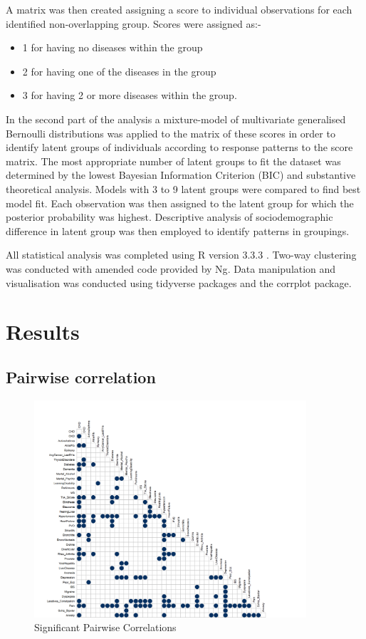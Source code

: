 \documentclass[12pt,]{report}
\providecommand{\tightlist}{%
  \setlength{\itemsep}{0pt}\setlength{\parskip}{0pt}}
\begin{document}
A matrix was then created assigning a score to individual observations
for each identified non-overlapping group. Scores were assigned as:-

\begin{itemize}
\tightlist
\item
  1 for having no diseases within the group
\item
  2 for having one of the diseases in the group
\item
  3 for having 2 or more diseases within the group.
\end{itemize}

In the second part of the analysis a mixture-model of multivariate
generalised Bernoulli distributions was applied to the matrix of these
scores in order to identify latent groups of individuals according to
response patterns to the score matrix. The most appropriate number of
latent groups to fit the dataset was determined by the lowest Bayesian
Information Criterion (BIC) and substantive theoretical analysis. Models
with 3 to 9 latent groups were compared to find best model fit. Each
observation was then assigned to the latent group for which the
posterior probability was highest. Descriptive analysis of
sociodemographic difference in latent group was then employed to
identify patterns in groupings.

All statistical analysis was completed using R version 3.3.3
\citep{RN295}. Two-way clustering was conducted with amended code
provided by Ng\citeyearpar{RN72}. Data manipulation and visualisation
was conducted using tidyverse packages \citep{RN296} and the corrplot
package.

\section{Results}\label{sec:clust-results}

\subsection{Pairwise correlation}\label{subsec:clust-pwcorr}

\begin{figure}
  \centering
    \includegraphics[width=0.9\textwidth]{figures/sd-corrplot.png}
  \caption{Significant Pairwise Correlations}
  \label{fig:corrplot}
\end{figure}
\end{document}

